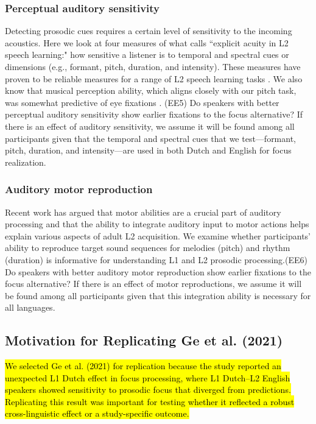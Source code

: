 \subsubsection{Perceptual auditory sensitivity}
Detecting prosodic cues requires a certain level of sensitivity to the incoming acoustics. Here we look at four measures of what \cite{saito2023does} calls ``explicit acuity in L2 speech learning:" how sensitive a listener is to temporal and spectral cues or dimensions (e.g., formant,
pitch, duration, and intensity). These measures have proven to be reliable measures for a range of L2 speech learning tasks \parencite{Kachlicka_Saito_Tierney_2019, saito2024auditory, bakkouche2025effects, bramlett_wiener_24_speechprosody}. We also know that musical perception ability, which aligns closely with our pitch task, was somewhat predictive of eye fixations \cite{jansen2023influence}. (EE5) Do speakers with better perceptual auditory sensitivity show earlier fixations to the focus alternative? If there is an effect of auditory sensitivity, we assume it will be found among all participants given that the temporal and spectral cues  that we test---formant, pitch, duration, and intensity---are used in both Dutch and English for focus realization.


\subsubsection{Auditory motor reproduction}
Recent work \parencite{tierney2014auditory, saito2024auditory,tierney2017individual} has argued that motor abilities are a crucial part of auditory processing and that the ability to integrate auditory input to motor actions helps explain various aspects of adult L2 acquisition. We examine whether participants' ability to reproduce target sound sequences for melodies (pitch) and rhythm (duration) is informative for understanding L1 and L2 prosodic processing.(EE6) Do speakers with better auditory motor reproduction show earlier fixations to the focus alternative? If there is an effect of motor reproductions, we assume it will be found among all participants given that this integration ability is necessary for all languages.

\subsection{Motivation for Replicating Ge et al. (2021)}

\hl{We selected Ge et al. (2021) for replication because the study reported an unexpected L1 Dutch effect in focus processing, where L1 Dutch–L2 English speakers showed sensitivity to prosodic focus that diverged from predictions. Replicating this result was important for testing whether it reflected a robust cross-linguistic effect or a study-specific outcome.}

